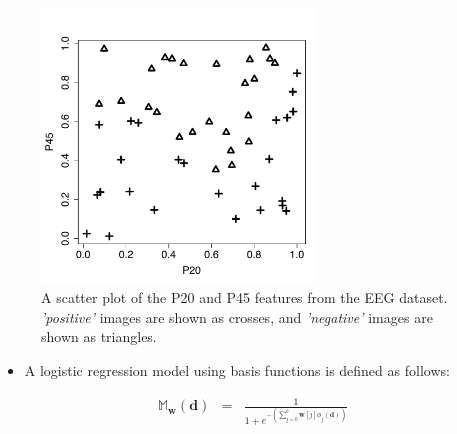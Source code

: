 \documentclass[xcolor={table}]{beamer}
\newcommand{\featN}[1]{\textsc{#1}}
\newcommand{\featL}[1]{\textit{'#1'}}
\begin{document}
 \begin{frame}[plain]
\begin{figure}[htb]
\begin{center}
\includegraphics[width=0.65\textwidth]{./images/basisfunctionLogisticClassificationDemoDataset.pdf}
\caption{A scatter plot of the \featN{P20} and \featN{P45} features from the EEG dataset. \featL{positive} images are shown as crosses, and \featL{negative} images are shown as triangles.}
\label{fig:eegNonLinearSep}
\end{center}
\end{figure}
\end{frame} 



 \begin{frame} 
 \begin{itemize}
 	\item A logistic regression model using basis functions is defined as follows:
\end{itemize}
\begin{eqnarray}
	\mathbb{M}_{\mathbf{w}}(\mathbf{d}) & = & \frac{1}{1+e^{-\left(\displaystyle \sum_{j=0}^{b} \mathbf{w}[j]{\phi}_j(\mathbf{d})\right)}}
	\label{eqn:logisticRegressionBasisFunctions}
\end{eqnarray}
\end{frame}
\end{document}
